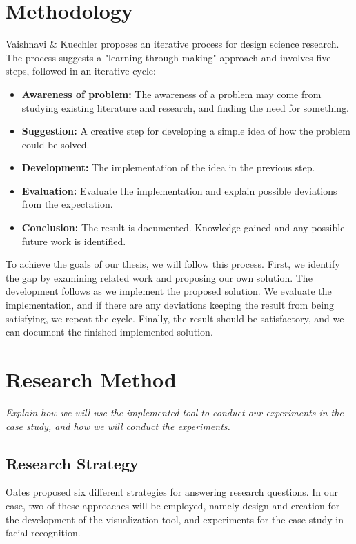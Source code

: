 \section{Methodology}

Vaishnavi \& Kuechler proposes an iterative process for design science research. The process suggests a "learning through making" approach and involves five steps, followed in an iterative cycle:

\begin{itemize}
    \item \textbf{Awareness of problem:} The awareness of a problem may come from studying existing literature and research, and finding the need for something.
    \item \textbf{Suggestion:} A creative step for developing a simple idea of how the problem could be solved.
    \item \textbf{Development:} The implementation of the idea in the previous step.
    \item \textbf{Evaluation:} Evaluate the implementation and explain possible deviations from the expectation.
    \item \textbf{Conclusion:} The result is documented. Knowledge gained and any possible future work is identified.
\end{itemize}

\noindent To achieve the goals of our thesis, we will follow this process. First, we identify the gap by examining related work and proposing our own solution. The development follows as we implement the proposed solution. We evaluate the implementation, and if there are any deviations keeping the result from being satisfying, we repeat the cycle. Finally, the result should be satisfactory, and we can document the finished implemented solution.

\section{Research Method}

\textit{Explain how we will use the implemented tool to conduct our experiments in the case study, and how we will conduct the experiments.}

\subsection{Research Strategy}

\noindent Oates proposed six different strategies for answering research questions. In our case, two of these approaches will be employed, namely design and creation for the development of the visualization tool, and experiments for the case study in facial recognition. \\

